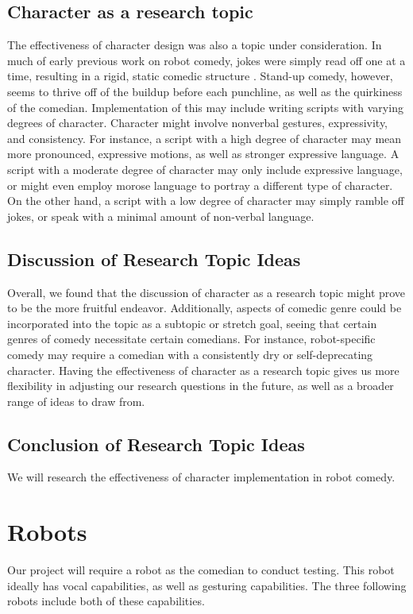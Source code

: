 \subsection{Character as a research topic}
The effectiveness of character design was also a topic under consideration.
In much of early previous work on robot comedy, jokes were simply read off one at a time, resulting in a rigid, static comedic structure \cite{RobotsMakeThings:2008}.
Stand-up comedy, however, seems to thrive off of the buildup before each punchline, as well as the quirkiness of the comedian.
Implementation of this may include writing scripts with varying degrees of character.
Character might involve nonverbal gestures, expressivity, and consistency.
For instance, a script with a high degree of character may mean more pronounced, expressive motions, as well as stronger expressive language.
A script with a moderate degree of character may only include expressive language, or might even employ morose language to portray a different type of character.
On the other hand, a script with a low degree of character may simply ramble off jokes, or speak with a minimal amount of non-verbal language.

\subsection{Discussion of Research Topic Ideas}
Overall, we found that the discussion of character as a research topic might prove to be the more fruitful endeavor.
Additionally, aspects of comedic genre could be incorporated into the topic as a subtopic or stretch goal, seeing that certain genres of comedy necessitate certain comedians.
For instance, robot-specific comedy may require a comedian with a consistently dry or self-deprecating character.
Having the effectiveness of character as a research topic gives us more flexibility in adjusting our research questions in the future, as well as a broader range of ideas to draw from.

\subsection{Conclusion of Research Topic Ideas}
We will research the effectiveness of character implementation in robot comedy.

\section{Robots}
Our project will require a robot as the comedian to conduct testing. This robot ideally has vocal capabilities, as well as gesturing capabilities. The three following robots include both of these capabilities.

